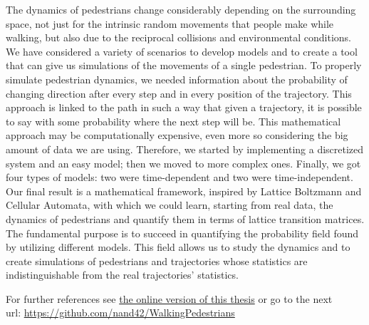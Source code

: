 \documentclass{standalone}
\begin{document}
The dynamics of pedestrians change considerably depending on the surrounding space, not just for the intrinsic random movements that people make while walking, but also due to the reciprocal collisions and environmental conditions. 
We have considered a variety of scenarios to develop models and to create a tool that can give us simulations of the movements of a single pedestrian. 
To properly simulate pedestrian dynamics, we needed information about the probability of changing direction after every step and in every position of the trajectory. 
This approach is linked to the path in such a way that given a trajectory, it is possible to say with some probability where the next step will be. 
This mathematical approach may be computationally expensive, even more so considering the big amount of data we are using. 
Therefore, we started by implementing a discretized system and an easy model; then we moved to more complex ones. 
Finally, we got four types of models: two were time-dependent and two were time-independent. 
Our final result is a mathematical framework, inspired by Lattice Boltzmann and Cellular Automata, with which we could learn, starting from real data, the dynamics of pedestrians and quantify them in terms of lattice transition matrices. 
The fundamental purpose is to succeed in quantifying the probability field found by utilizing different models. 
This field allows us to study the dynamics and to create simulations of pedestrians and trajectories whose statistics are indistinguishable from the real trajectories’ statistics.

\vspace*{13.5cm}

For further references see \href{https://github.com/nand42/WalkingPedestrians}{the online version of this thesis} 
or go to the next 
\\ \hspace*{4mm} url: \url{https://github.com/nand42/WalkingPedestrians}
\end{document}
